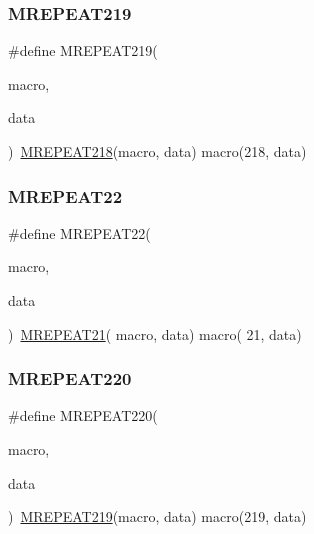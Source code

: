 \mbox{\label{group__group__sam0__utils__mrepeat_gad3ad7ca1333f24fd50e250e28d312509}} 
\subsubsection{\texorpdfstring{MREPEAT219}{MREPEAT219}}
{\footnotesize\ttfamily \#define M\+R\+E\+P\+E\+A\+T219(\begin{DoxyParamCaption}\item[{}]{macro,  }\item[{}]{data }\end{DoxyParamCaption})~\mbox{\hyperlink{group__group__sam0__utils__mrepeat_ga35dba4e312bc00bcfcbf099981b01206}{M\+R\+E\+P\+E\+A\+T218}}(macro, data)   macro(218, data)}

\mbox{\label{group__group__sam0__utils__mrepeat_ga9ac17b91b98d21f0fdbfc1f4739fe0ed}} 
\subsubsection{\texorpdfstring{MREPEAT22}{MREPEAT22}}
{\footnotesize\ttfamily \#define M\+R\+E\+P\+E\+A\+T22(\begin{DoxyParamCaption}\item[{}]{macro,  }\item[{}]{data }\end{DoxyParamCaption})~\mbox{\hyperlink{group__group__sam0__utils__mrepeat_ga7eaa38d60b2cfa155145e2d908577783}{M\+R\+E\+P\+E\+A\+T21}}( macro, data)   macro( 21, data)}

\mbox{\label{group__group__sam0__utils__mrepeat_ga87b159389edf9a6b6f2e0fcf17139964}} 
\subsubsection{\texorpdfstring{MREPEAT220}{MREPEAT220}}
{\footnotesize\ttfamily \#define M\+R\+E\+P\+E\+A\+T220(\begin{DoxyParamCaption}\item[{}]{macro,  }\item[{}]{data }\end{DoxyParamCaption})~\mbox{\hyperlink{group__group__sam0__utils__mrepeat_gad3ad7ca1333f24fd50e250e28d312509}{M\+R\+E\+P\+E\+A\+T219}}(macro, data)   macro(219, data)}

